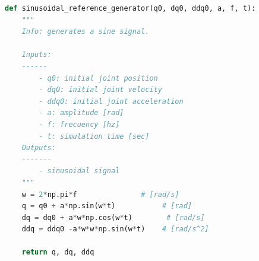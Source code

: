 \begin{lstlisting}[language=Python,caption=Function to generate sinusoidal reference., label={lst:sine_reference_generator}]
    def sinusoidal_reference_generator(q0, dq0, ddq0, a, f, t):
    """
    Info: generates a sine signal.

    Inputs: 
    ------
        - q0: initial joint position
        - dq0: initial joint velocity
        - ddq0: initial joint acceleration
        - a: amplitude [rad]
        - f: frecuency [hz]
        - t: simulation time [sec]
    Outputs:
    -------
        - sinusoidal signal
    """
    w = 2*np.pi*f               # [rad/s]
    q = q0 + a*np.sin(w*t)           # [rad]
    dq = dq0 + a*w*np.cos(w*t)        # [rad/s]
    ddq = ddq0 -a*w*w*np.sin(w*t)    # [rad/s^2]

    return q, dq, ddq
\end{lstlisting}
